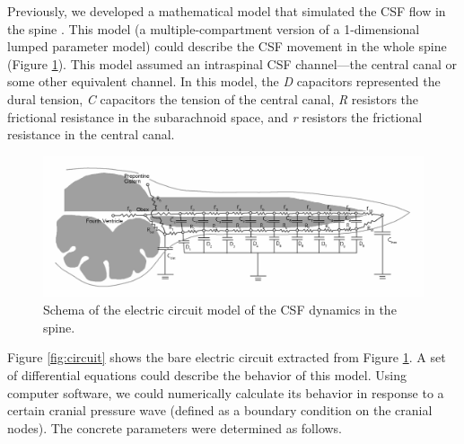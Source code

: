 \documentclass[fleqn,10pt]{wlscirep}
\begin{document}
Previously, we developed a mathematical model that simulated the CSF flow
in the spine \cite{chang2003hypothesis, chang2004theoretical}. This model
(a multiple-compartment version of a 1-dimensional lumped parameter model)
could describe the CSF movement in the whole spine (Figure
\ref{fig:model}). This model assumed an intraspinal CSF channel---the
central canal or some other equivalent channel.  In this model, the
\textit{D} capacitors represented the dural tension, \textit{C} capacitors
the tension of the central canal, \textit{R} resistors the frictional
resistance in the subarachnoid space, and \textit{r} resistors the
frictional resistance in the central canal.

\begin{figure}[ht]
    \centering
    \includegraphics[width=\textwidth]{ps_circuit_schema.jpg}
    \caption{Schema of the electric circuit model of the CSF dynamics in the
    spine.}
    \label{fig:model}
\end{figure}

Figure \ref{fig:circuit} shows the bare electric circuit extracted from
Figure \ref{fig:model}. A set of differential equations could describe the
behavior of this model.  Using computer software, we could numerically
calculate its behavior in response to a certain cranial pressure wave
(defined as a boundary condition on the cranial nodes). The concrete
parameters were determined as follows.
\end{document}
